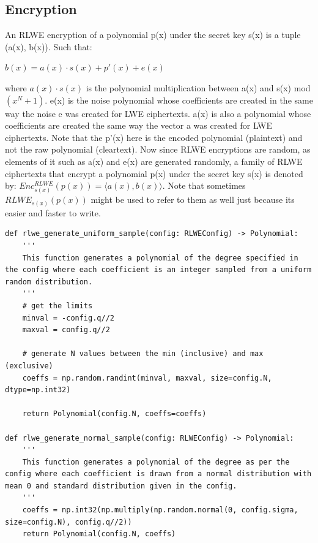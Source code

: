 \documentclass{report}
\begin{document}
		\subsection{Encryption}
			An RLWE encryption of a polynomial p(x) under the secret key s(x) is a tuple (a(x), b(x)). Such that: \newline
			\begin{center}
				$b(x) = a(x) \cdot s(x) + p'(x) + e(x)$
			\end{center}
			where $a(x) \cdot s(x)$ is the polynomial multiplication between a(x) and s(x) mod $(x^N + 1)$. e(x) is the noise polynomial whose coefficients are created in the same way the noise e was created for LWE ciphertexts. a(x) is also a polynomial whose coefficients are created the same way the vector a was created for LWE ciphertexts. Note that the p'(x) here is the encoded polynomial (plaintext) and not the raw polynomial (cleartext).
			Now since RLWE encryptions are random, as elements of it such as a(x) and e(x) are generated randomly, a family of RLWE ciphertexts that encrypt a polynomial p(x) under the secret key s(x) is denoted by: $Enc^{RLWE}_{s(x)} ( p(x)) = \langle a(x), b(x) \rangle$. Note that sometimes $RLWE_{s(x)}(p(x))$ might be used to refer to them as well just because its easier and faster to write.\newpage
		
\begin{verbatim}
def rlwe_generate_uniform_sample(config: RLWEConfig) -> Polynomial:
	'''
	This function generates a polynomial of the degree specified in the config where each coefficient is an integer sampled from a uniform random distribution.
	'''
	# get the limits
	minval = -config.q//2
	maxval = config.q//2
	
	# generate N values between the min (inclusive) and max (exclusive)
	coeffs = np.random.randint(minval, maxval, size=config.N, dtype=np.int32)
	
	return Polynomial(config.N, coeffs=coeffs)
	
def rlwe_generate_normal_sample(config: RLWEConfig) -> Polynomial:
	'''
	This function generates a polynomial of the degree as per the config where each coefficient is drawn from a normal distribution with mean 0 and standard distribution given in the config.
	'''
	coeffs = np.int32(np.multiply(np.random.normal(0, config.sigma, size=config.N), config.q//2))
	return Polynomial(config.N, coeffs)
\end{verbatim}
\end{document}

